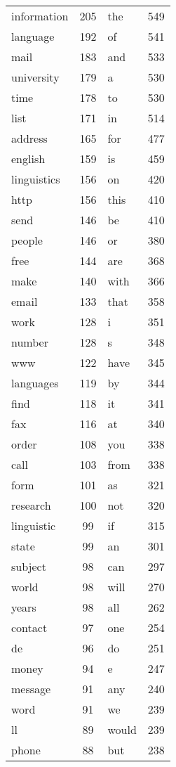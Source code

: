 \documentclass[10pt, a4paper]{article}
\begin{document}
\begin{tabular}{l c l c}
information & 205 & the & 549 \\
language & 192 & of & 541 \\
mail & 183 & and & 533 \\
university & 179 & a & 530 \\
time & 178 & to & 530 \\
list & 171 & in & 514 \\
address & 165 & for & 477 \\
english & 159 & is & 459 \\
linguistics & 156 & on & 420 \\
http & 156 & this & 410 \\
send & 146 & be & 410 \\
people & 146 & or & 380 \\
free & 144 & are & 368 \\
make & 140 & with & 366 \\
email & 133 & that & 358 \\
work & 128 & i & 351 \\
number & 128 & s & 348 \\
www & 122 & have & 345 \\
languages & 119 & by & 344 \\
find & 118 & it & 341 \\
fax & 116 & at & 340 \\
order & 108 & you & 338 \\
call & 103 & from & 338 \\
form & 101 & as & 321 \\
research & 100 & not & 320 \\
linguistic & 99 & if & 315 \\
state & 99 & an & 301 \\
subject & 98 & can & 297 \\
world & 98 & will & 270 \\
years & 98 & all & 262 \\
contact & 97 & one & 254 \\
de & 96 & do & 251 \\
money & 94 & e & 247 \\
message & 91 & any & 240 \\
word & 91 & we & 239 \\
ll & 89 & would & 239 \\
phone & 88 & but & 238 \\

\end{tabular}
\end{document}
